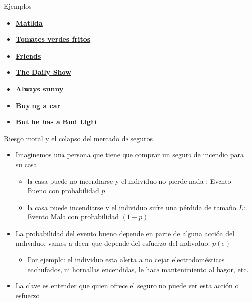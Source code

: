 \documentclass{beamer}
\begin{document}
\begin{frame}{Ejemplos}
    \begin{itemize}
    \item \href{https://www.youtube.com/watch?v=qlg0qakJhKU}{\textbf{Matilda}}
    \item \href{https://www.youtube.com/watch?v=akA8co61He4}{\textbf{Tomates verdes fritos}}
    \item \href{https://www.youtube.com/watch?v=X8BPfLhH6MA}{\textbf{Friends}}
    \item \href{https://videos.criticalcommons.org/media/encoded/16/jtierney86/43ba1b1ac3e94df3974f987cc912ae_Hxgbfl1.mp4}{\textbf{The Daily Show}}
    \item \href{http://videos.criticalcommons.org/transcoded/http/www.criticalcommons.org/Members/JJWooten/clips/always-sunny-paying-for-care/video_file/mp4-high/always-sunny-cost-of-care-mp4.mp4}{\textbf{Always sunny}}
    \item \href{https://www.youtube.com/watch?v=SrPu-xGrKrk}{\textbf{Buying a car}}
    \item \href{https://www.youtube.com/watch?v=ZZq0ShjEd-E}{\textbf{But he has a Bud Light}}
    \end{itemize}

\end{frame}
    





\begin{frame}{Riesgo moral y el colapso del mercado de seguros}
 \begin{itemize}
    \item Imaginemos una persona que tiene que comprar un seguro de incendio para su casa
    \begin{itemize}
    \item la casa puede no incendiarse y el individuo no pierde nada : Evento Bueno con probabilidad $p$
    \item la casa puede incendiarse y el individuo sufre una pérdida de tamaño $L$: Evento Malo con probabilidad $(1-p)$ 
    \end{itemize}
    \vspace{1mm}
    \item La probabilidad del evento bueno depende en parte de alguna acción del individuo, vamos a decir que depende del esfuerzo del individuo: $p(e)$
    \begin{itemize}
    \item Por ejemplo: el individuo esta alerta a no dejar electrodomésticos enchufados, ni hornallas encendidas, le hace mantenimiento al hagor, etc.
    \end{itemize}
    \item La clave es entender que quien ofrece el seguro no puede ver esta acción o esfuerzo
\end{itemize}
\end{frame}
\end{document}
